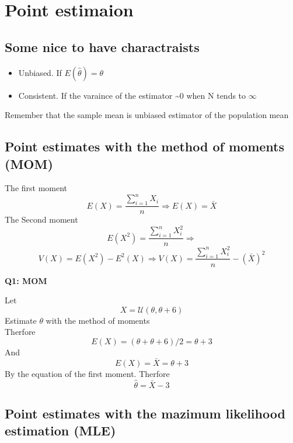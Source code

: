 \documentclass[]{article}
\providecommand{\tightlist}{%
  \setlength{\itemsep}{0pt}\setlength{\parskip}{0pt}}
\begin{document}
\hypertarget{point-estimaion}{%
\section{Point estimaion}\label{point-estimaion}}

\hypertarget{some-nice-to-have-charactraists}{%
\subsection{Some nice to have
charactraists}\label{some-nice-to-have-charactraists}}

\begin{itemize}
\tightlist
\item
  Unbiased. If \(E(\hat{\theta}) = \theta\)
\item
  Consistent. If the varaince of the estimator \textasciitilde{}0 when N
  tends to \(\infty\)
\end{itemize}

Remember that the sample mean is unbiased estimator of the population
mean

\hypertarget{point-estimates-with-the-method-of-moments-mom}{%
\subsection{Point estimates with the method of moments
(MOM)}\label{point-estimates-with-the-method-of-moments-mom}}

The first moment
\[E(X)=\frac{\sum_{i=1}^{n} X_{i}}{n} \Rightarrow E(X)=\bar{X}\] The
Second moment
\[E\left(X^{2}\right)=\frac{\sum_{i=1}^{n} X_{i}^{2}}{n} \Rightarrow \]
\[V(X)=E\left(X^{2}\right)-E^{2}(X) \Rightarrow V(X)=\frac{\sum_{i=1}^{n} X_{i}^{2}}{n}-(\bar{X})^{2}\]

\textbf{Q1: MOM}

Let \[X =  \mathcal{U}\left(\theta , \theta + 6 \right)\] Estimate
\(\theta\) with the method of moments\\

Therfore \[E(X) =  (\theta + \theta+ 6 )/2 = \theta +3\] And
\[E(X) = \bar{X} = \theta +3\] By the equation of the first moment.
Therfore \[\hat{\theta} = \bar{X}  -3\]

\hypertarget{point-estimates-with-the-mazimum-likelihood-estimation-mle}{%
\subsection{Point estimates with the mazimum likelihood estimation
(MLE)}\label{point-estimates-with-the-mazimum-likelihood-estimation-mle}}
\end{document}
